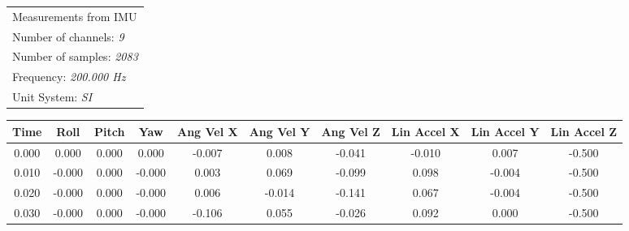 \documentclass[]{article}
\begin{document}
	\newpage
	
	\begin{table}[H]
		\begin{flushleft}
			\begin{tabular}{l}
				\toprule 
				\footnotesize Measurements from IMU \\
				\footnotesize Number of channels: \textit{9} \\
				\footnotesize Number of samples: \textit{2083} \\
				\footnotesize Frequency: \textit{200.000 Hz} \\
				\footnotesize Unit System: \textit{SI} \\
			\end{tabular}
			
		\end{flushleft}
		\begin{center}
			\begin{tabular}{cccccccccc}
				\toprule
				
				\footnotesize Time & \footnotesize Roll & \footnotesize Pitch & \footnotesize Yaw & \footnotesize Ang Vel X & \footnotesize Ang Vel Y & \footnotesize Ang Vel Z & \footnotesize Lin  Accel X & \footnotesize Lin Accel Y & \footnotesize Lin Accel Z \\
				\midrule
				
				\footnotesize 0.000 & \footnotesize 0.000 & \footnotesize 0.000 & \footnotesize 0.000 & \footnotesize -0.007 & \footnotesize 0.008 & \footnotesize -0.041 & \footnotesize -0.010 & \footnotesize 0.007 & \footnotesize -0.500 \\
				
				\footnotesize 0.010 & \footnotesize -0.000 & \footnotesize 0.000 & \footnotesize -0.000 & \footnotesize 0.003 & \footnotesize 0.069 & \footnotesize -0.099 & \footnotesize 0.098 & \footnotesize -0.004 & \footnotesize -0.500 \\
			
				
				\footnotesize 0.020 & \footnotesize -0.000 & \footnotesize 0.000 & \footnotesize -0.000 & \footnotesize 0.006 & \footnotesize -0.014 & \footnotesize -0.141 & \footnotesize 0.067 & \footnotesize -0.004 & \footnotesize -0.500 \\
				
				
				\footnotesize 0.030 & \footnotesize -0.000 & \footnotesize 0.000 & \footnotesize -0.000 & \footnotesize -0.106 & \footnotesize 0.055 & \footnotesize -0.026 & \footnotesize 0.092 & \footnotesize 0.000 & \footnotesize -0.500 \\
				

\end{tabular}
\end{center}
\end{table}
\end{document}
